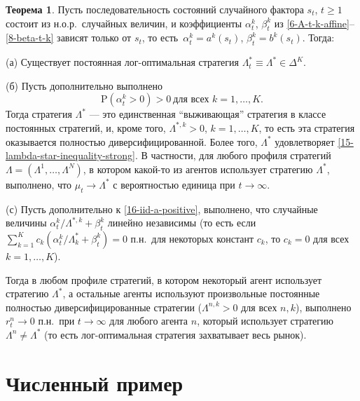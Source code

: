 \documentclass[a4paper,12pt,russian]{article} %
\theoremstyle{definition}
\newtheorem{theorem}{Теорема}
\renewcommand{\P}{\mathrm{P}}
\begin{document}
\begin{theorem}
\label{theorem3-iid}
Пусть последовательность состояний случайного фактора $s_t$, $t\ge1$ состоит из н.о.р.\ случайных величин, и коэффициенты $\alpha_{t}^k$, $\beta_{t}^k$ из \eqref{6-A-t-k-affine}--\eqref{8-beta-t-k} зависят только от $s_t$, то есть\ $\alpha_{t}^k = a^k(s_t)$, $\beta_{t}^k = b^k(s_t)$.
Тогда:

\smallskip
\noindent
(а) Существует постоянная лог-оптимальная стратегия $\Lambda^*_t \equiv \Lambda^*\in \Delta^K$.

\smallskip
\noindent
(б) Пусть дополнительно выполнено
\begin{equation}
\label{16-iid-a-positive}
\P(\alpha_{t}^k > 0) > 0\ \text{для всех $k=1,\dots,K$}.
\end{equation}
Тогда стратегия $\Lambda^*$  — это единственная ``выживающая'' стратегия в классе постоянных стратегий, и, кроме того,  $\Lambda^{*,k}>0$, $k=1,\dots,K$, то есть эта стратегия оказывается полностью диверсифицированной.
Более того, $\Lambda^*$ удовлетворяет  \eqref{15-lambda-star-inequality-strong}.
В частности, для любого профиля стратегий $\Lambda=(\Lambda^1,\dots,\Lambda^N)$, в котором какой-то из агентов использует стратегию $\Lambda^*$, выполнено, что $\mu_t \to \Lambda^*$ с вероятностью единица при $t\to\infty$. 

\smallskip
\noindent
(с) Пусть дополнительно к \eqref{16-iid-a-positive}, выполнено, что случайные величины $\alpha_{t}^k/\Lambda^{*,k} + \beta_{t}^k$ линейно независимы (то есть если $\sum_{k=1}^K c_k(\alpha_{t}^k/\Lambda^*_k + \beta_{t}^k) = 0$ п.н.\ для некоторых констант $c_k$, то $c_k=0$ для всех $k=1,\dots,K$). 

Тогда в любом профиле стратегий, в котором некоторый агент использует стратегию $\Lambda^*$, а остальные агенты используют произвольные постоянные полностью диверсифицированные стратегии ($\Lambda^{n,k}>0$ для всех $n,k$), выполнено $r_t^n\to0$ п.н.\ при $t\to\infty$ для любого агента $n$, который использует стратегию $\Lambda^n \neq\Lambda^*$ (то есть лог-оптимальная стратегия захватывает весь рынок).
\end{theorem}






\section{Численный пример}
\label{section4-example}
\end{document}
